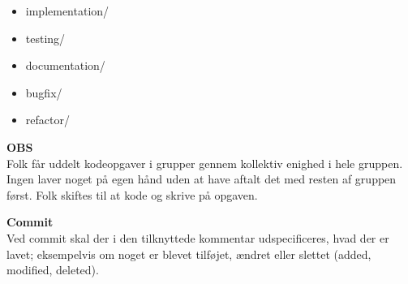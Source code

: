 \documentclass{article}
\begin{document}
\begin{itemize}
 	\item implementation/
 	\item testing/
 	\item documentation/
	\item bugfix/
	\item refactor/
\end{itemize}

\textbf{OBS}
\\
Folk får uddelt kodeopgaver i grupper gennem kollektiv enighed i hele gruppen. Ingen laver noget på egen hånd uden at have aftalt det med resten af gruppen først. Folk skiftes til at kode og skrive på opgaven.

\textbf{Commit}
\\
Ved commit skal der i den tilknyttede kommentar udspecificeres, hvad der er lavet; eksempelvis om noget er blevet tilføjet, ændret eller slettet (added, modified, deleted).
\end{document}
